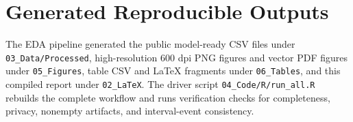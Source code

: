 \documentclass[11pt]{article}
\begin{document}
\section{Generated Reproducible Outputs}
The EDA pipeline generated the public model-ready CSV files under \texttt{03\_Data/Processed}, high-resolution 600 dpi PNG figures and vector PDF figures under \texttt{05\_Figures}, table CSV and LaTeX fragments under \texttt{06\_Tables}, and this compiled report under \texttt{02\_LaTeX}. The driver script \texttt{04\_Code/R/run\_all.R} rebuilds the complete workflow and runs verification checks for completeness, privacy, nonempty artifacts, and interval-event consistency.
\end{document}
